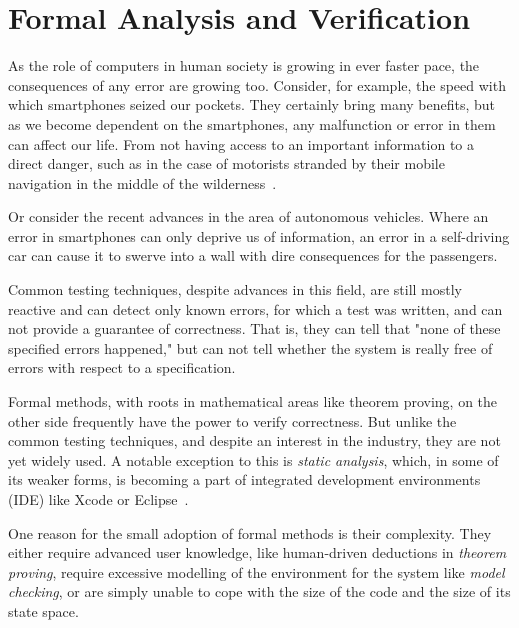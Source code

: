 
\chapter{Formal Analysis and Verification} \label{chap:fav}
As the role of computers in human society is growing in ever faster pace,
the consequences of any error are growing too. Consider, for example, the
speed with which smartphones seized our pockets. They certainly bring many
benefits, but as we become dependent on the smartphones, any malfunction or
error in them can affect our life. From not having access to an important
information to a direct danger, such as in the case of motorists stranded by
their mobile navigation in the middle of the wilderness~\cite{appleMaps}.

Or consider the recent advances in the area of autonomous vehicles. Where
an error in smartphones can only deprive us of information, an error in a
self-driving car can cause it to swerve into a wall with dire consequences
for the passengers.

Common testing techniques, despite advances in this field, are still mostly reactive and can detect only known errors, for which a test was written, and can not provide a guarantee of correctness. That is, they can tell that "none of these specified errors happened," but can not tell whether the system is really free of errors with respect to a specification.

Formal methods, with roots in mathematical areas like theorem proving, on
the other side frequently have the power to verify correctness. But
unlike the common testing techniques, and despite an interest in the
industry, they are not yet widely used. A notable exception to this is
{\em static analysis}, which, in some of its weaker forms, is becoming a
part of integrated development environments (IDE) like Xcode or
Eclipse~\cite{xcodeAnalysis}.

One reason for the small adoption of formal methods is their complexity. They either require advanced user knowledge, like human-driven deductions in {\em theorem proving}, require excessive modelling of the environment for the system like {\em model checking}, or are simply unable to cope with the size of the code and the size of its state space.

